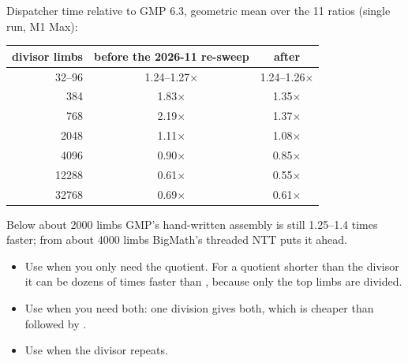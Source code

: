 Dispatcher time relative to GMP 6.3, geometric mean over the 11 ratios (single run, M1 Max):

\begin{center}
\small
\begin{tabular}{rcc}
\toprule
divisor limbs & before the 2026-11 re-sweep & after \\
\midrule
32--96 & 1.24--1.27$\times$ & 1.24--1.26$\times$ \\
384 & 1.83$\times$ & 1.35$\times$ \\
768 & 2.19$\times$ & 1.37$\times$ \\
2048 & 1.11$\times$ & 1.08$\times$ \\
4096 & 0.90$\times$ & 0.85$\times$ \\
12288 & 0.61$\times$ & 0.55$\times$ \\
32768 & 0.69$\times$ & 0.61$\times$ \\
\bottomrule
\end{tabular}
\end{center}

Below about 2000 limbs GMP's hand-written assembly is still 1.25--1.4 times faster; from about
4000 limbs BigMath's threaded NTT puts it ahead.

\begin{practice}
\begin{itemize}
  \item Use  when you only need the quotient. For a quotient shorter than the
        divisor it can be dozens of times faster than , because only the
        top limbs are divided.
  \item Use  when you need both: one division gives both, which is
        cheaper than  followed by .
  \item Use  when the divisor repeats.
\end{itemize}
\end{practice}
